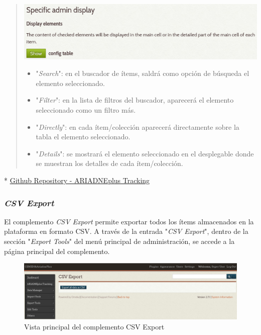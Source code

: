 \documentclass[
]{article}
\providecommand{\tightlist}{%
  \setlength{\itemsep}{0pt}\setlength{\parskip}{0pt}}
\begin{document}
\begin{itemize}
  \begin{quote}
  \includegraphics{../_static/images/at-cf-6.png}

  \begin{itemize}
  \tightlist
  \item
    "\emph{Search}": en el buscador de ítems, saldrá como opción de
    búsqueda el elemento seleccionado.
  \item
    "\emph{Filter}": en la lista de filtros del buscador, aparecerá el
    elemento seleccionado como un filtro más.
  \item
    "\emph{Directly}": en cada ítem/colección aparecerá directamente
    sobre la tabla el elemento seleccionado.
  \item
    "\emph{Details}": se mostrará el elemento seleccionado en el
    desplegable donde se muestran los detalles de cada ítem/colección.
  \end{itemize}
  \end{quote}
\end{itemize}

*
\href{https://github.com/gcm1001/TFG-CeniehAriadne/tree/master/omeka/plugins/AriadnePlusTracking}{Github
Repository - ARIADNEplus Tracking}

\hypertarget{csv-export}{%
\subsubsection{\texorpdfstring{\emph{CSV
Export}}{CSV Export}}\label{csv-export}}

El complemento \emph{CSV Export} permite exportar todos los ítems
almacenados en la plataforma en formato CSV. A través de la entrada
"\emph{CSV Export}", dentro de la sección "\emph{Export Tools}" del menú
principal de administración, se accede a la página principal del
complemento.

\begin{figure}
\hypertarget{csv-export-view}{%
\centering
\includegraphics{../_static/images/csv-export-view.png}
\caption{Vista principal del complemento CSV
Export}\label{csv-export-view}
}
\end{figure}
\end{document}
